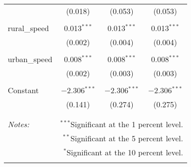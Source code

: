 \documentclass{article}
\begin{document}
\begin{table}[!htbp]
\begin{tabular}{@{\extracolsep{5pt}}lccc}
  & (0.018) & (0.053) & (0.053) \\ 
  & & & \\ 
 rural\_speed & 0.013$^{***}$ & 0.013$^{***}$ & 0.013$^{***}$ \\ 
  & (0.002) & (0.004) & (0.004) \\ 
  & & & \\ 
 urban\_speed & 0.008$^{***}$ & 0.008$^{***}$ & 0.008$^{***}$ \\ 
  & (0.002) & (0.003) & (0.003) \\ 
  & & & \\ 
 Constant & $-$2.306$^{***}$ & $-$2.306$^{***}$ & $-$2.306$^{***}$ \\ 
  & (0.141) & (0.274) & (0.275) \\ 
  & & & \\ 
\hline 
\hline \\[-1.8ex] 
\textit{Notes:} & \multicolumn{3}{r}{$^{***}$Significant at the 1 percent level.} \\ 
 & \multicolumn{3}{r}{$^{**}$Significant at the 5 percent level.} \\ 
 & \multicolumn{3}{r}{$^{*}$Significant at the 10 percent level.} \\ 
\normalsize 
\end{tabular} 
\end{table} 
\end{document}
